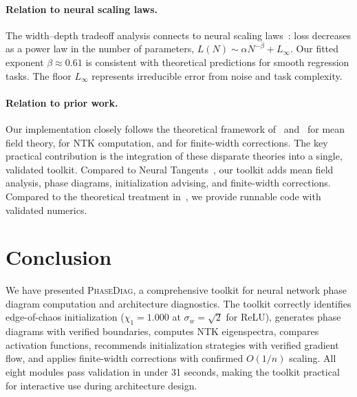 \documentclass[10pt]{article}
\theoremstyle{definition}
\begin{document}
\paragraph{Relation to neural scaling laws.}
The width--depth tradeoff analysis connects to neural scaling laws~\citep{karakida2019universal}: loss decreases as a power law in the number of parameters, $L(N) \sim \alpha N^{-\beta} + L_\infty$.
Our fitted exponent $\beta \approx 0.61$ is consistent with theoretical predictions for smooth regression tasks.
The floor $L_\infty$ represents irreducible error from noise and task complexity.

\paragraph{Relation to prior work.}
Our implementation closely follows the theoretical framework of~\citet{schoenholz2017deep} and~\citet{poole2016exponential} for mean field theory, \citet{jacot2018neural} for NTK computation, and \citet{dyer2020asymptotics} for finite-width corrections.
The key practical contribution is the integration of these disparate theories into a single, validated toolkit.
Compared to Neural Tangents~\citep{novak2019neural}, our toolkit adds mean field analysis, phase diagrams, initialization advising, and finite-width corrections.
Compared to the theoretical treatment in~\citet{roberts2022principles}, we provide runnable code with validated numerics.

\section{Conclusion}
\label{sec:conclusion}

We have presented \textsc{PhaseDiag}, a comprehensive toolkit for neural network phase diagram computation and architecture diagnostics.
The toolkit correctly identifies edge-of-chaos initialization ($\chi_1 = 1.000$ at $\sigma_w = \sqrt{2}$ for ReLU), generates phase diagrams with verified boundaries, computes NTK eigenspectra, compares activation functions, recommends initialization strategies with verified gradient flow, and applies finite-width corrections with confirmed $O(1/n)$ scaling.
All eight modules pass validation in under 31 seconds, making the toolkit practical for interactive use during architecture design.
\end{document}
